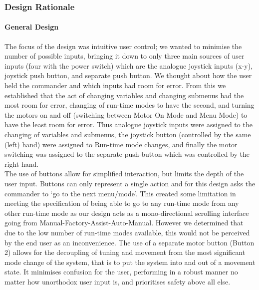 \documentclass[MTRX3700report.tex]{subfiles}
\begin{document}
	
	\subsubsection{Design Rationale}
	\paragraph{General Design}
	The focus of the design was intuitive user control; we wanted to minimise the number of possible inputs, bringing it down to only three main sources of user inputs (four with the power switch) which are the analogue joystick inputs (x-y), joystick push button, and separate push button. We thought about how the user held the commander and which inputs had room for error. From this we established that the act of changing variables and changing submenus had the most room for error, changing of run-time modes to have the second, and turning the motors on and off (switching between Motor On Mode and Menu Mode) to have the least room for error. Thus analogue joystick inputs were assigned to the changing of variables and submenus, the joystick button (controlled by the same (left) hand) were assigned to Run-time mode changes, and finally the motor switching was assigned to the separate push-button which was controlled by the right hand.\\
	
	The use of buttons allow for simplified interaction, but limits the depth of the user input. Buttons can only represent a single action and for this design asks the commander to `go to the next menu/mode'. This created some limitation in meeting the specification of being able to go to any run-time mode from any other run-time mode as our design acts as a mono-directional scrolling interface going from Manual-Factory-Assist-Auto-Manual. However we determined that due to the low number of run-time modes available, this would not be perceived by the end user as an inconvenience. The use of a separate motor button (Button 2) allows for the decoupling of tuning and movement from the most significant mode change of the system, that is to put the system into and out of a movement state. It minimises confusion for the user, performing in a robust manner no matter how unorthodox user input is, and prioritises safety above all else.
	
\end{document}
